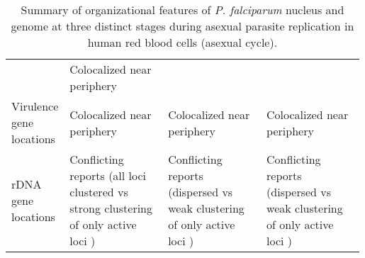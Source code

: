 \begin{table}
\begin{tabular}{p{0.15\linewidth}p{0.28\linewidth}p{0.28\linewidth}p{0.28\linewidth}}
& Colocalized near periphery {\small \citep{ay:three-dimensional, freitas-junior:frequent}}
\\ Virulence gene locations
& Colocalized {\small \citep{lemieux:genome-wide}} near periphery {\small \citep{ay:three-dimensional, lopez-rubio:genome-wide, freitas-junior:frequent}}
& Colocalized near periphery {\small \citep{ay:three-dimensional, lopez-rubio:genome-wide, freitas-junior:frequent}}
& Colocalized near periphery {\small \citep{ay:three-dimensional, lopez-rubio:genome-wide, freitas-junior:frequent}}
\\ rDNA gene locations
& Conflicting reports (all loci clustered {\small \citep{mancio-silva:clustering}} vs strong clustering of only
active loci {\small \citep{ay:three-dimensional, lemieux:genome-wide}})
& Conflicting reports (dispersed {\small \citep{mancio-silva:clustering}} vs weak clustering of only active loci
{\small \citep{ay:three-dimensional}})
& Conflicting reports (dispersed {\small \citep{mancio-silva:clustering}} vs weak clustering of only active loci
{\small \citep{ay:three-dimensional}}) \\
\end{tabular}
\caption{Summary of organizational features of \textit{P. falciparum} nucleus and
genome at three distinct stages during asexual parasite replication in human
red blood cells (asexual cycle).}
\label{table:features}
\end{table}


